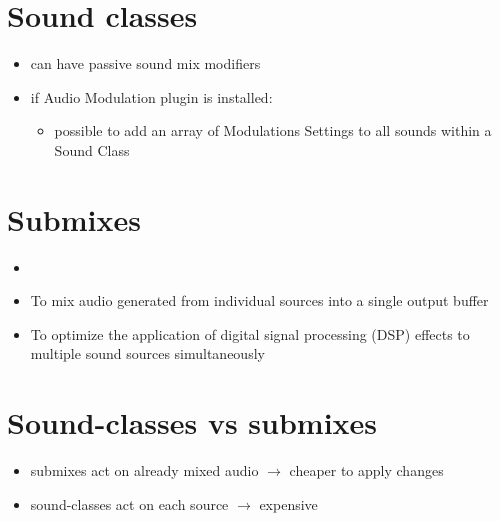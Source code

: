     \section{Sound classes}
        \begin{itemize}
            \item can have passive sound mix modifiers
            \item if Audio Modulation plugin is installed:
            \begin{itemize}
                \item possible to add an array of Modulations Settings to all sounds within a Sound Class
            \end{itemize} 
        \end{itemize}

    \section{Submixes}
        \begin{itemize}
            \item 
            \item To mix audio generated from individual sources into a single output buffer
            \item To optimize the application of digital signal processing (DSP) effects to multiple sound sources simultaneously
        \end{itemize}

    \section{Sound-classes vs submixes}
        \begin{itemize}
            \item submixes act on already mixed audio $\rightarrow$ cheaper to apply changes
            \item sound-classes act on each source $\rightarrow$ expensive
        \end{itemize}


